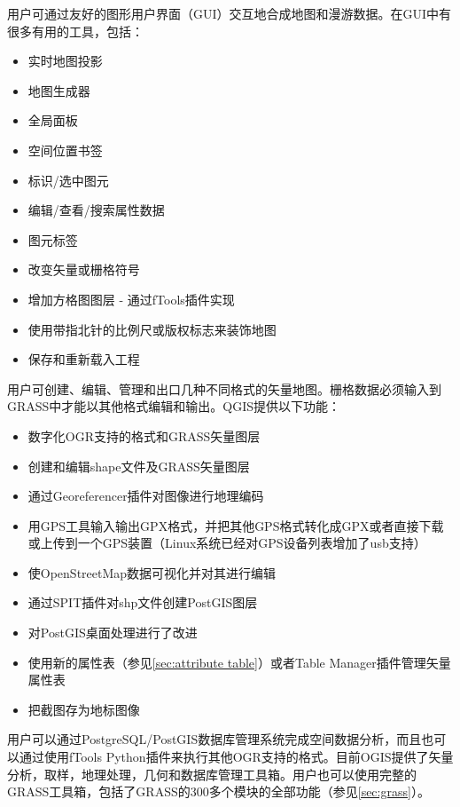 
用户可通过友好的图形用户界面（GUI）交互地合成地图和漫游数据。在GUI中有很多有用的工具，包括：

\begin{itemize}[label=--]
\item 实时地图投影
\item 地图生成器
\item 全局面板
\item 空间位置书签
\item 标识/选中图元
\item 编辑/查看/搜索属性数据
\item 图元标签
\item 改变矢量或栅格符号
\item 增加方格图图层 - 通过fTools插件实现
\item 使用带指北针的比例尺或版权标志来装饰地图
\item 保存和重新载入工程
\end{itemize}


用户可创建、编辑、管理和出口几种不同格式的矢量地图。栅格数据必须输入到GRASS中才能以其他格式编辑和输出。QGIS提供以下功能：

\begin{itemize}[label=--]
\item 数字化OGR支持的格式和GRASS矢量图层
\item 创建和编辑shape文件及GRASS矢量图层
\item 通过Georeferencer插件对图像进行地理编码
\item 用GPS工具输入输出GPX格式，并把其他GPS格式转化成GPX或者直接下载或上传到一个GPS装置（Linux系统已经对GPS设备列表增加了usb支持）
\item 使OpenStreetMap数据可视化并对其进行编辑
\item 通过SPIT插件对shp文件创建PostGIS图层
\item 对PostGIS桌面处理进行了改进
\item 使用新的属性表（参见\ref{sec:attribute table}）或者Table Manager插件管理矢量属性表
\item 把截图存为地标图像
\end{itemize}


用户可以通过PostgreSQL/PostGIS数据库管理系统完成空间数据分析，而且也可以通过使用fTools Python插件来执行其他OGR支持的格式。目前OGIS提供了矢量分析，取样，地理处理，几何和数据库管理工具箱。用户也可以使用完整的GRASS工具箱，包括了GRASS的300多个模块的全部功能（参见\ref{sec:grass}）。

